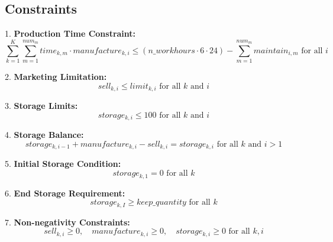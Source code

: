 \documentclass{article}
\begin{document}
\subsection*{Constraints}

1. \textbf{Production Time Constraint:}
\[
\sum_{k=1}^{K} \sum_{m=1}^{num_m} time_{k,m} \cdot manufacture_{k,i} \leq (n\_workhours \cdot 6 \cdot 24) - \sum_{m=1}^{num_m} maintain_{i,m} \text{ for all } i
\]

2. \textbf{Marketing Limitation:}
\[
sell_{k,i} \leq limit_{k,i} \text{ for all } k \text{ and } i
\]

3. \textbf{Storage Limits:}
\[
storage_{k,i} \leq 100 \text{ for all } k \text{ and } i
\]

4. \textbf{Storage Balance:}
\[
storage_{k,i-1} + manufacture_{k,i} - sell_{k,i} = storage_{k,i} \text{ for all } k \text{ and } i > 1
\]

5. \textbf{Initial Storage Condition:}
\[
storage_{k,1} = 0 \text{ for all } k
\]

6. \textbf{End Storage Requirement:}
\[
storage_{k,I} \geq keep\_quantity \text{ for all } k
\]

7. \textbf{Non-negativity Constraints:}
\[
sell_{k,i} \geq 0, \quad manufacture_{k,i} \geq 0, \quad storage_{k,i} \geq 0 \text{ for all } k, i
\]
\end{document}
